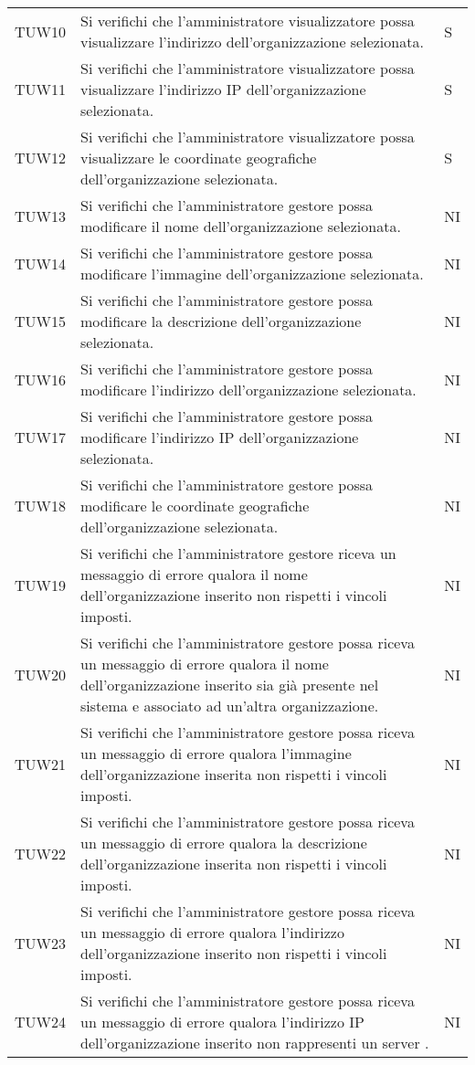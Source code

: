 {\begin{longtable}{ c C{13cm} C{1cm}}
TUW10 & Si verifichi che l'amministratore visualizzatore possa visualizzare l’indirizzo dell'organizzazione selezionata. & S \\
TUW11 & Si verifichi che l'amministratore visualizzatore possa visualizzare l’indirizzo IP dell'organizzazione selezionata. & S \\
TUW12 & Si verifichi che l'amministratore visualizzatore possa visualizzare le coordinate geografiche dell'organizzazione selezionata. & S \\
TUW13 & Si verifichi che l'amministratore gestore possa modificare il nome dell'organizzazione selezionata. & NI \\
TUW14 & Si verifichi che l'amministratore gestore possa modificare l’immagine dell'organizzazione selezionata. & NI \\
TUW15 & Si verifichi che l'amministratore gestore possa modificare la descrizione dell'organizzazione selezionata. & NI \\
TUW16 & Si verifichi che l'amministratore gestore possa modificare l’indirizzo dell'organizzazione selezionata. & NI \\
TUW17 & Si verifichi che l'amministratore gestore possa modificare l’indirizzo IP dell'organizzazione selezionata. & NI \\
TUW18 & Si verifichi che l'amministratore gestore possa modificare le coordinate geografiche dell'organizzazione selezionata. & NI \\
TUW19 & Si verifichi che l'amministratore gestore riceva un messaggio di errore qualora il nome dell'organizzazione inserito non rispetti i vincoli imposti. & NI \\
TUW20 & Si verifichi che l'amministratore gestore possa riceva un messaggio di errore qualora il nome dell'organizzazione inserito sia già presente nel sistema e associato ad un'altra organizzazione. & NI \\
TUW21 & Si verifichi che l'amministratore gestore possa riceva un messaggio di errore qualora l'immagine dell'organizzazione inserita non rispetti i vincoli imposti. & NI \\
TUW22 & Si verifichi che l'amministratore gestore possa riceva un messaggio di errore qualora la descrizione dell'organizzazione inserita non rispetti i vincoli imposti. & NI \\
TUW23 & Si verifichi che l'amministratore gestore possa riceva un messaggio di errore qualora l'indirizzo dell'organizzazione inserito non rispetti i vincoli imposti. & NI \\
TUW24 & Si verifichi che l'amministratore gestore possa riceva un messaggio di errore qualora l'indirizzo IP dell'organizzazione inserito non rappresenti un server . & NI \\

\end{longtable}}
